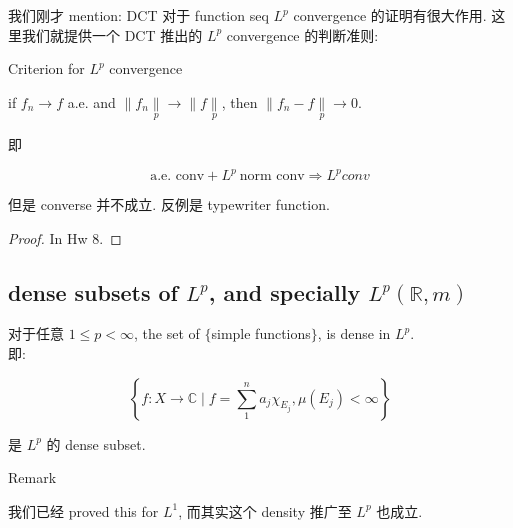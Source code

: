 \documentclass{qlnotes-export}
\begin{document}
我们刚才 mention: DCT 对于 function seq \(L^{p}\) convergence 的证明有很大作用. 这里我们就提供一个 DCT 推出的 \(L^{p}\) convergence 的判断准则:

\begin{theorem}{Criterion for \(L^{p}\) convergence}\label{thm-09-l-p-space-and-inequalities-criterion-for-l-p-convergence}

if \(f_{n}\rightarrow f\) a.e. and \(\parallel f_{n}\underset{p}{\parallel}\rightarrow \parallel f\underset{p}{\parallel}\), then \(\parallel f_{n} - f\underset{p}{\parallel}\rightarrow 0\).

\end{theorem}

即

\[\text{a.e. conv} + L^{p}\ \text{norm conv}\Longrightarrow L^{p}conv\]

但是 converse 并不成立. 反例是 typewriter function.

\begin{proof}

In Hw 8.

\end{proof}

\subsection{\texorpdfstring{dense subsets of \(L^{p}\), and specially \(L^{p}({\mathbb{R}},m)\)}{dense subsets of L\^{}\{p\}, and specially L\^{}\{p\}(\{\textbackslash mathbb\{R\}\},m)}}\label{dense-subsets-of-lp-and-specially-lpmathbbrm}

\begin{proposition}\label{prop-09-l-p-space-and-inequalities-proposition-001}

对于任意 \(1 \leq p < \infty\), the set of \(\{\)simple functions\(\}\), is dense in \(L^{p}\).\\
即:

\[\left\{ {f:X\rightarrow{\mathbb{C}} \mid f = \sum\limits_{1}^{n}a_{j}\chi_{E_{j}},\mu(E_{j}) < \infty} \right\}\]

是 \(L^{p}\) 的 dense subset.

\end{proposition}

\begin{qlremark}{Remark}

我们已经 proved this for \(L^{1}\), 而其实这个 density 推广至 \(L^{p}\) 也成立.

\end{qlremark}
\end{document}
